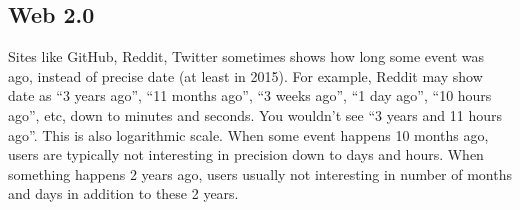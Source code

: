 \subsection{Web 2.0}

Sites like GitHub, Reddit, Twitter sometimes shows how long some event was ago, instead of precise date (at least in 2015).
For example, Reddit may show date as ``3 years ago'', ``11 months ago'', ``3 weeks ago'', ``1 day ago'', ``10 hours ago'', etc, down to minutes and seconds.
You wouldn't see ``3 years and 11 hours ago''.
This is also logarithmic scale.
When some event happens 10 months ago, users are typically not interesting in precision down to days and hours.
When something happens 2 years ago, users usually not interesting in number of months and days in addition to these 2 years.

